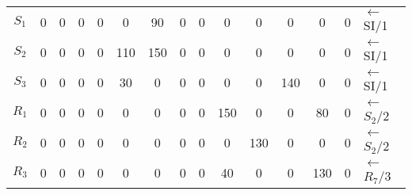\documentclass[12pt]{article}
\begin{document}
\begin{enumerate}
\begin{tabular}{|c|c|c|c|c|c|c|c|c|c|c|c|c|c|l}
$S_1$ & 0  & {\color[HTML]{000000} 0}        & {\color[HTML]{000000} 0}        & {\color[HTML]{000000} 0}        & {\color[HTML]{000000} 0}   & {\color[HTML]{000000} 90}  & {\color[HTML]{000000} 0}   & {\color[HTML]{000000} 0}  & {\color[HTML]{000000} 0}   & {\color[HTML]{000000} 0}   & {\color[HTML]{000000} 0}   & {\color[HTML]{000000} 0}   & {\color[HTML]{000000} 0}   & ${\leftarrow}$ SI/1    \\ \cline{1-14}
$S_2$ & 0  & {\color[HTML]{000000} 0}        & {\color[HTML]{000000} 0}        & {\color[HTML]{000000} 0}        & {\color[HTML]{FE0000} 110} & {\color[HTML]{000000} 150} & {\color[HTML]{000000} 0}   & {\color[HTML]{000000} 0}  & {\color[HTML]{000000} 0}   & {\color[HTML]{000000} 0}   & {\color[HTML]{000000} 0}   & {\color[HTML]{000000} 0}   & {\color[HTML]{000000} 0}   & ${\leftarrow}$ SI/1    \\ \cline{1-14}
$S_3$ & 0  & {\color[HTML]{000000} 0}        & {\color[HTML]{000000} 0}        & {\color[HTML]{000000} 0}        & {\color[HTML]{000000} 30}  & {\color[HTML]{000000} 0}   & {\color[HTML]{000000} 0}   & {\color[HTML]{000000} 0}  & {\color[HTML]{000000} 0}   & {\color[HTML]{000000} 0}   & {\color[HTML]{000000} 140} & {\color[HTML]{000000} 0}   & {\color[HTML]{000000} 0}   & ${\leftarrow}$ SI/1    \\ \cline{1-14}
$R_1$ & 0  & {\color[HTML]{000000} 0}        & {\color[HTML]{000000} 0}        & {\color[HTML]{000000} 0}        & {\color[HTML]{000000} 0}   & {\color[HTML]{000000} 0}   & {\color[HTML]{000000} 0}   & {\color[HTML]{000000} 0}  & {\color[HTML]{FE0000} 150} & {\color[HTML]{000000} 0}   & {\color[HTML]{000000} 0}   & {\color[HTML]{000000} 80}  & {\color[HTML]{000000} 0}   & ${\leftarrow}$ $S_2$/2 \\ \cline{1-14}
$R_2$ & 0  & {\color[HTML]{000000} 0}        & {\color[HTML]{000000} 0}        & {\color[HTML]{000000} 0}        & {\color[HTML]{000000} 0}   & {\color[HTML]{000000} 0}   & {\color[HTML]{000000} 0}   & {\color[HTML]{000000} 0}  & {\color[HTML]{000000} 0}   & {\color[HTML]{000000} 130} & {\color[HTML]{000000} 0}   & {\color[HTML]{000000} 0}   & {\color[HTML]{000000} 0}   & ${\leftarrow}$ $S_2$/2 \\ \cline{1-14}
$R_3$ & 0  & {\color[HTML]{000000} 0}        & {\color[HTML]{000000} 0}        & {\color[HTML]{000000} 0}        & {\color[HTML]{000000} 0}   & {\color[HTML]{000000} 0}   & {\color[HTML]{000000} 0}   & {\color[HTML]{000000} 0}  & {\color[HTML]{000000} 40}  & {\color[HTML]{000000} 0}   & {\color[HTML]{000000} 0}   & {\color[HTML]{000000} 130} & {\color[HTML]{000000} 0}   & ${\leftarrow}$ $R_7$/3 \\ \cline{1-14}

\end{tabular}
\end{enumerate}
\end{document}
